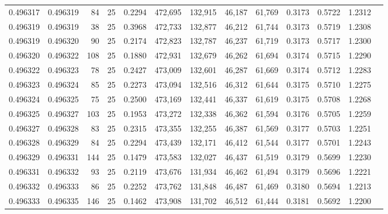 \begin{tabular}{rrrrrrrrrrrrr}
0.496317 & 0.496319 &    84 &  25 &                                     0.2294 & 472,695 & 132,915 &  46,187 &  61,769 & 0.3173 & 0.5722 & 1.2312 \\
0.496319 & 0.496319 &    38 &  25 &                                     0.3968 & 472,733 & 132,877 &  46,212 &  61,744 & 0.3173 & 0.5719 & 1.2308 \\
0.496319 & 0.496320 &    90 &  25 &                                     0.2174 & 472,823 & 132,787 &  46,237 &  61,719 & 0.3173 & 0.5717 & 1.2300 \\
0.496320 & 0.496322 &   108 &  25 &                                     0.1880 & 472,931 & 132,679 &  46,262 &  61,694 & 0.3174 & 0.5715 & 1.2290 \\
0.496322 & 0.496323 &    78 &  25 &                                     0.2427 & 473,009 & 132,601 &  46,287 &  61,669 & 0.3174 & 0.5712 & 1.2283 \\
0.496323 & 0.496324 &    85 &  25 &                                     0.2273 & 473,094 & 132,516 &  46,312 &  61,644 & 0.3175 & 0.5710 & 1.2275 \\
0.496324 & 0.496325 &    75 &  25 &                                     0.2500 & 473,169 & 132,441 &  46,337 &  61,619 & 0.3175 & 0.5708 & 1.2268 \\
0.496325 & 0.496327 &   103 &  25 &                                     0.1953 & 473,272 & 132,338 &  46,362 &  61,594 & 0.3176 & 0.5705 & 1.2259 \\
0.496327 & 0.496328 &    83 &  25 &                                     0.2315 & 473,355 & 132,255 &  46,387 &  61,569 & 0.3177 & 0.5703 & 1.2251 \\
0.496328 & 0.496329 &    84 &  25 &                                     0.2294 & 473,439 & 132,171 &  46,412 &  61,544 & 0.3177 & 0.5701 & 1.2243 \\
0.496329 & 0.496331 &   144 &  25 &                                     0.1479 & 473,583 & 132,027 &  46,437 &  61,519 & 0.3179 & 0.5699 & 1.2230 \\
0.496331 & 0.496332 &    93 &  25 &                                     0.2119 & 473,676 & 131,934 &  46,462 &  61,494 & 0.3179 & 0.5696 & 1.2221 \\
0.496332 & 0.496333 &    86 &  25 &                                     0.2252 & 473,762 & 131,848 &  46,487 &  61,469 & 0.3180 & 0.5694 & 1.2213 \\
0.496333 & 0.496335 &   146 &  25 &                                     0.1462 & 473,908 & 131,702 &  46,512 &  61,444 & 0.3181 & 0.5692 & 1.2200 \\

\end{tabular}
